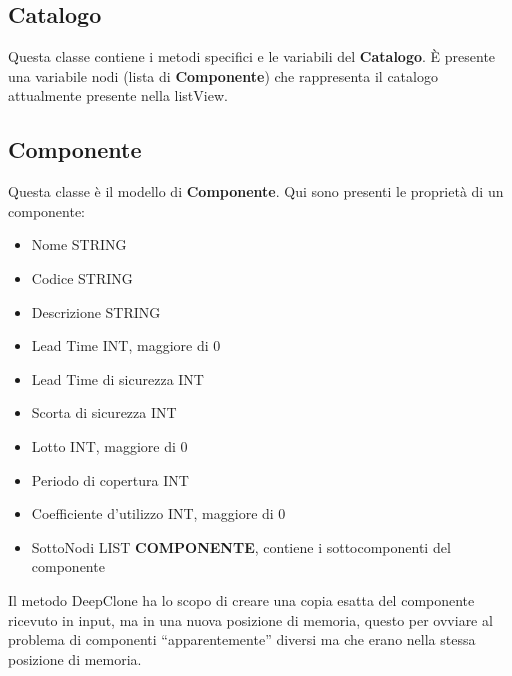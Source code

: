 \documentclass[12pt,twoside]{report}
\begin{document}
\subsection{Catalogo}

Questa classe contiene i metodi specifici e le variabili del \textbf{Catalogo}. È presente una variabile nodi (lista di \textbf{Componente})  che rappresenta il catalogo attualmente presente nella listView.

\subsection{Componente}

Questa classe è il modello di \textbf{Componente}. Qui sono presenti le proprietà di un componente:

\begin{itemize}
	\bigskip
	\bigskip
	\item Nome \space\space\space\space\space\space STRING
	\item Codice \space\space\space\space\space\space STRING
	\item Descrizione \space\space\space\space\space\space STRING
	\item Lead Time \space\space\space\space\space\space INT, maggiore di 0 
	\item Lead Time di sicurezza \space\space\space\space\space\space INT
	\item Scorta di sicurezza \space\space\space\space\space\space INT
	\item Lotto \space\space\space\space\space\space INT, maggiore di 0 
	\item Periodo di copertura  \space\space\space\space\space\space INT
	\item Coefficiente d’utilizzo \space\space\space\space\space\space INT, maggiore di 0 
	\item SottoNodi \space\space\space\space\space\space     LIST \textbf{COMPONENTE}, contiene i sottocomponenti del componente
	      	      
\end{itemize}
Il metodo DeepClone ha lo scopo di creare una copia esatta del componente ricevuto in input, ma in una nuova posizione di memoria, questo per ovviare al problema di componenti “apparentemente” diversi ma che erano nella stessa posizione di memoria.

\end{document}
